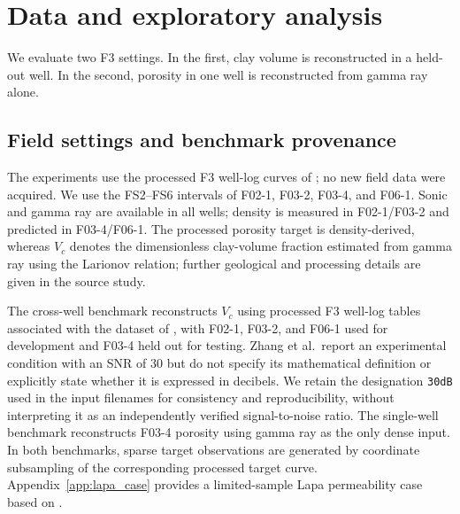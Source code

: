 \section{Data and exploratory analysis}
\label{sec:data_eda}

We evaluate two F3 settings. In the first, clay volume is reconstructed in a
held-out well. In the second, porosity in one well is reconstructed from
gamma ray alone.

\subsection{Field settings and benchmark provenance}
\label{subsec:field_settings}

The experiments use the processed F3 well-log curves of
\citet{zhang2025rockphysicslogs}; no new field data were acquired. We use the
FS2--FS6 intervals of F02-1, F03-2, F03-4, and F06-1. Sonic and gamma ray are
available in all wells; density is measured in F02-1/F03-2 and predicted in
F03-4/F06-1. The processed porosity target is density-derived, whereas
$V_c$ denotes the dimensionless clay-volume fraction estimated from gamma
ray using the Larionov relation; further geological and processing details
are given in the source study.

The cross-well benchmark reconstructs $V_c$ using processed F3 well-log
tables associated with the dataset of \citet{zhang2025rockphysicslogs}, with
F02-1, F03-2, and F06-1 used for development and F03-4 held out for testing.
Zhang et al.\ report an experimental condition with an SNR of 30 but do not
specify its mathematical definition or explicitly state whether it is
expressed in decibels. We retain the designation \texttt{30dB} used in the
input filenames for consistency and reproducibility, without interpreting it
as an independently verified signal-to-noise ratio. The single-well
benchmark reconstructs F03-4 porosity using gamma ray as the only dense
input. In both benchmarks, sparse target observations are generated by
coordinate subsampling of the corresponding processed target curve.
Appendix~\ref{app:lapa_case} provides a limited-sample Lapa permeability case
based on \citet{alvarez2025nonlinear}.

\begin{table}[!htbp]
    \centering
    \caption{Summary of the two F3 benchmarks. The cross-well target $V_c$ is
    derived from gamma ray through the Larionov relation, whereas the
    single-well target is processed porosity.}
    \label{tab:eda_dataset_summary}
    \small
\end{table}

